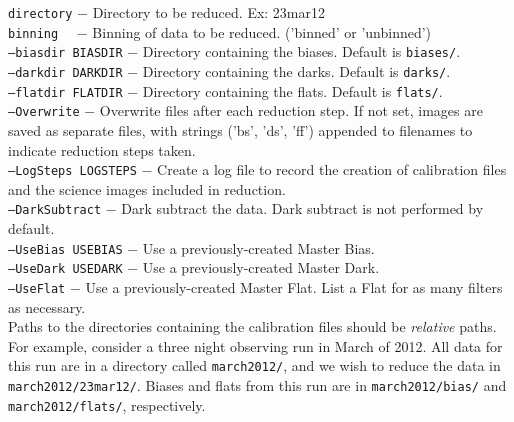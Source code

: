 \documentclass{article}
\begin{document}
\texttt{directory} $-$ Directory to be reduced. Ex: 23mar12\\

\texttt{binning}~~ $-$ Binning of data to be reduced. ('binned' or 
    'unbinned')\\

\texttt{--biasdir BIASDIR} $-$ Directory containing the biases. 
    Default is \texttt{biases/}.\\

\texttt{--darkdir DARKDIR} $-$ Directory containing the darks. 
    Default is \texttt{darks/}.\\

\texttt{--flatdir FLATDIR} $-$ Directory containing the flats. 
    Default is \texttt{flats/}. \\

\texttt{--Overwrite} $-$ \hangindent=3.1cm Overwrite files after each 
     reduction step. If not set, images are saved as separate files, with
     strings ('bs', 'ds', 'ff') appended to  
     filenames to indicate reduction steps taken. \\

\texttt{--LogSteps LOGSTEPS} $-$ \hangindent=4.6cm Create a log file to 
    record the creation of calibration files and the science images 
    included in reduction. \\

\texttt{--DarkSubtract} $-$ Dark subtract the data. Dark subtract is not
    performed by default.\\

\texttt{--UseBias USEBIAS} $-$ Use a previously-created Master Bias. \\

\texttt{--UseDark USEDARK} $-$ Use a previously-created Master Dark. \\

\texttt{--UseFlat} $-$ Use a previously-created Master Flat. List a 
                       Flat for as many filters as necessary. \\

\noindent Paths to the directories containing the calibration files
should be \textit{relative} paths.
For example, consider a three night observing run in March of 2012. 
All data for this run are in a directory called \texttt{march2012/},
and we wish to reduce the data in \texttt{march2012/23mar12/}.
Biases and flats from this run are in \texttt{march2012/bias/}
and \texttt{march2012/flats/}, respectively.\\
\end{document}
